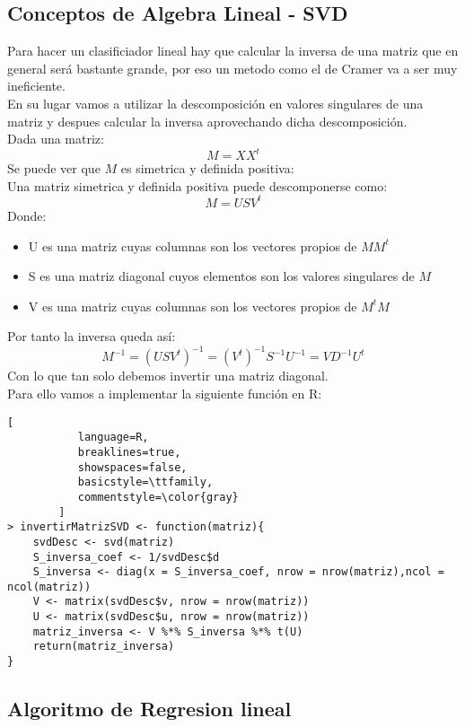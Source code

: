 \documentclass[11pt,fleqn]{book} %
\begin{document}
\subsection{Conceptos de Algebra Lineal - SVD}
Para hacer un clasificiador lineal hay que calcular la inversa de una matriz que en general será bastante grande, por eso un metodo como el de Cramer va a ser muy ineficiente.\\
En su lugar vamos a utilizar la descomposición en valores singulares de una matriz y despues calcular la inversa aprovechando dicha descomposición.\\
Dada una matriz:
$$ M = X X^t$$ 
Se puede ver que $M$ es simetrica y definida positiva:\\
Una matriz simetrica y definida positiva puede descomponerse como:
$$M = USV^t$$
Donde:
\begin{itemize}
 \item {U es una matriz cuyas columnas son los vectores propios de $MM^t$}
 \item {S es una matriz diagonal cuyos elementos son los valores singulares de $M$}
 \item {V es una matriz cuyas columnas son los vectores propios de $M^tM$}
\end{itemize}
Por tanto la inversa queda así:
$$ M^{-1} = (USV^t)^{-1} = (V^t)^{-1}S^{-1}U^{-1} = VD^{-1}U^t$$
Con lo que tan solo debemos invertir una matriz diagonal.	\\
Para ello vamos a implementar la siguiente función en R:

\begin{lstlisting}[
           language=R,
           breaklines=true,
           showspaces=false,
           basicstyle=\ttfamily,
           commentstyle=\color{gray}
        ]    
> invertirMatrizSVD <- function(matriz){
    svdDesc <- svd(matriz)
    S_inversa_coef <- 1/svdDesc$d
    S_inversa <- diag(x = S_inversa_coef, nrow = nrow(matriz),ncol = ncol(matriz))
    V <- matrix(svdDesc$v, nrow = nrow(matriz))
    U <- matrix(svdDesc$u, nrow = nrow(matriz))
    matriz_inversa <- V %*% S_inversa %*% t(U) 
    return(matriz_inversa)
}  
\end{lstlisting}

\subsection{Algoritmo de Regresion lineal}
\end{document}
